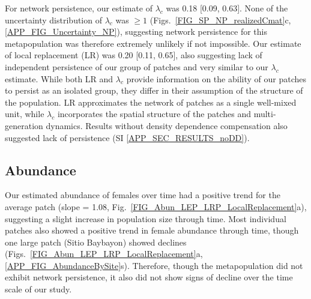 \documentclass[12pt, oneside]{article}   	%
\begin{document}
For network persistence, our estimate of $\lambda_{c}$ was 0.18 [0.09, 0.63]. None of the uncertainty distribution of $\lambda_c$ was $\geq 1$ (Figs.\ \ref{FIG_SP_NP_realizedCmat}c, \ref{APP_FIG_Uncertainty_NP}), suggesting network persistence for this metapopulation was therefore extremely unlikely if not impossible. Our estimate of local replacement (LR) was 0.20 [0.11, 0.65], also suggesting lack of independent persistence of our group of patches and very similar to our $\lambda_{c}$ estimate. While both LR and $\lambda_{c}$ provide information on the ability of our patches to persist as an isolated group, they differ in their assumption of the structure of the population. LR approximates the network of patches as a single well-mixed unit, while $\lambda_{c}$ incorporates the spatial structure of the patches and multi-generation dynamics. Results without density dependence compensation also suggested lack of persistence (SI \ref{APP_SEC_RESULTS_noDD}).


\subsection*{Abundance}

Our estimated abundance of females over time had a positive trend for the average patch (slope = 1.08, Fig.\ \ref{FIG_Abun_LEP_LRP_LocalReplacement}a), suggesting a slight increase in population size through time. Most individual patches also showed a positive trend in female abundance through time, though one large patch (Sitio Baybayon) showed declines (Figs.\ \ref{FIG_Abun_LEP_LRP_LocalReplacement}a, \ref{APP_FIG_AbundanceBySite}s). Therefore, though the metapopulation did not exhibit network persistence, it also did not show signs of decline over the time scale of our study. 
\end{document}
